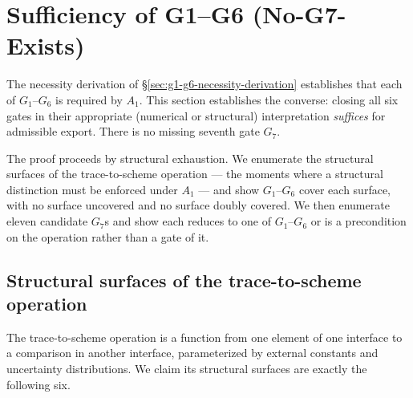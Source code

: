 \section{Sufficiency of G1--G6 (No-G7-Exists)}
\label{sec:g1-g6-sufficiency}

The necessity derivation of \S\ref{sec:g1-g6-necessity-derivation} establishes that each of $G_1$--$G_6$ is required by $A_1$. This section establishes the converse: closing all six gates in their appropriate (numerical or structural) interpretation \emph{suffices} for admissible export. There is no missing seventh gate $G_7$.

The proof proceeds by structural exhaustion. We enumerate the structural surfaces of the trace-to-scheme operation --- the moments where a structural distinction must be enforced under $A_1$ --- and show $G_1$--$G_6$ cover each surface, with no surface uncovered and no surface doubly covered. We then enumerate eleven candidate $G_7$s and show each reduces to one of $G_1$--$G_6$ or is a precondition on the operation rather than a gate of it.

\subsection{Structural surfaces of the trace-to-scheme operation}
\label{subsec:operation-surfaces}

The trace-to-scheme operation is a function from one element of one interface to a comparison in another interface, parameterized by external constants and uncertainty distributions. We claim its structural surfaces are exactly the following six.

